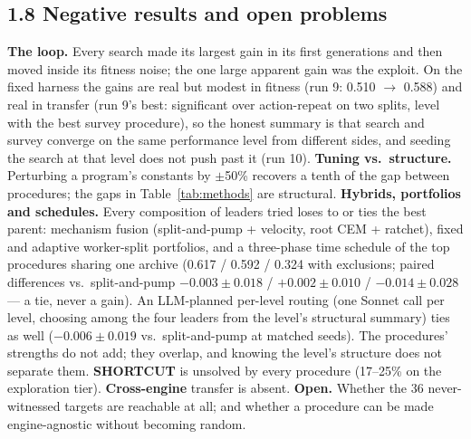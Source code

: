 \subsection*{1.8 Negative results and open problems}
\textbf{The loop.} Every search made its largest gain in its first generations and then moved inside its fitness noise; the one large apparent gain was the exploit. On the fixed harness the gains are real but modest in fitness (run 9: 0.510 $\to$ 0.588) and real in transfer (run 9's best: significant over action-repeat on two splits, level with the best survey procedure), so the honest summary is that search and survey converge on the same performance level from different sides, and seeding the search at that level does not push past it (run 10).
\textbf{Tuning vs.\ structure.} Perturbing a program's constants by $\pm$50\% recovers a tenth of the gap between procedures;
the gaps in Table~\ref{tab:methods} are structural. \textbf{Hybrids, portfolios and schedules.} Every composition of leaders tried loses to or ties the best parent: mechanism fusion (split-and-pump + velocity, root CEM + ratchet), fixed and adaptive worker-split portfolios, and a three-phase time schedule of the top procedures sharing one archive (0.617 / 0.592 / 0.324 with exclusions; paired differences vs.\ split-and-pump $-0.003\pm0.018$ / $+0.002\pm0.010$ / $-0.014\pm0.028$ --- a tie, never a gain). An LLM-planned per-level routing (one Sonnet call per level, choosing among the four leaders from the level's structural summary) ties as well ($-0.006\pm0.019$ vs.\ split-and-pump at matched seeds). The procedures' strengths do not add; they overlap, and knowing the level's structure does not separate them. \textbf{SHORTCUT} is unsolved by
every procedure (17--25\% on the exploration tier). \textbf{Cross-engine} transfer is absent. \textbf{Open.} Whether the 36 never-witnessed targets
are reachable at all; and whether a procedure can
be made engine-agnostic without becoming random.

